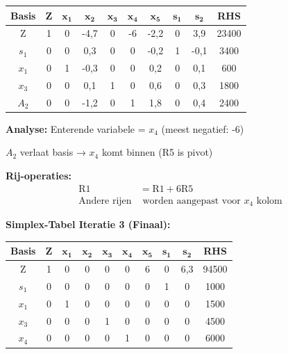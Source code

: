 \documentclass[a4paper,11pt]{article}
\begin{document}
\begin{oefenblok}[title=Lineair Programmeren — Rylon Parfums]
\begin{center}
\small
\begin{tabular}{|c|c|c|c|c|c|c|c|c|c|}
\hline
\textbf{Basis} & \textbf{Z} & $\mathbf{x_1}$ & $\mathbf{x_2}$ & $\mathbf{x_3}$ & $\mathbf{x_4}$ & $\mathbf{x_5}$ & $\mathbf{s_1}$ & $\mathbf{s_2}$ & \textbf{RHS} \\
\hline
Z & 1 & 0 & -4{,}7 & 0 & -6 & -2{,}2 & 0 & 3{,}9 & 23400 \\
\hline
$s_1$ & 0 & 0 & 0{,}3 & 0 & 0 & -0{,}2 & 1 & -0{,}1 & 3400 \\
\hline
$x_1$ & 0 & 1 & -0{,}3 & 0 & 0 & 0{,}2 & 0 & 0{,}1 & 600 \\
\hline
$x_3$ & 0 & 0 & 0{,}1 & 1 & 0 & 0{,}6 & 0 & 0{,}3 & 1800 \\
\hline
$A_2$ & 0 & 0 & -1{,}2 & 0 & 1 & 1{,}8 & 0 & 0{,}4 & 2400 \\
\hline
\end{tabular}
\end{center}

\textbf{Analyse:} Enterende variabele = $x_4$ (meest negatief: -6)

$A_2$ verlaat basis → $x_4$ komt binnen (R5 is pivot)

\textbf{Rij-operaties:}
\begin{align*}
\text{R1} &= \text{R1} + 6\text{R5} \\
\text{Andere rijen} &\text{ worden aangepast voor } x_4 \text{ kolom}
\end{align*}

\vspace{0.3cm}

\textbf{Simplex-Tabel Iteratie 3 (Finaal):}

\begin{center}
\small
\begin{tabular}{|c|c|c|c|c|c|c|c|c|c|}
\hline
\textbf{Basis} & \textbf{Z} & $\mathbf{x_1}$ & $\mathbf{x_2}$ & $\mathbf{x_3}$ & $\mathbf{x_4}$ & $\mathbf{x_5}$ & $\mathbf{s_1}$ & $\mathbf{s_2}$ & \textbf{RHS} \\
\hline
Z & 1 & 0 & 0 & 0 & 0 & 6 & 0 & 6{,}3 & 94500 \\
\hline
$s_1$ & 0 & 0 & 0 & 0 & 0 & 0 & 1 & 0 & 1000 \\
\hline
$x_1$ & 0 & 1 & 0 & 0 & 0 & 0 & 0 & 0 & 1500 \\
\hline
$x_3$ & 0 & 0 & 0 & 1 & 0 & 0 & 0 & 0 & 4500 \\
\hline
$x_4$ & 0 & 0 & 0 & 0 & 1 & 0 & 0 & 0 & 6000 \\
\hline
\end{tabular}
\end{center}


\end{oefenblok}
\end{document}
